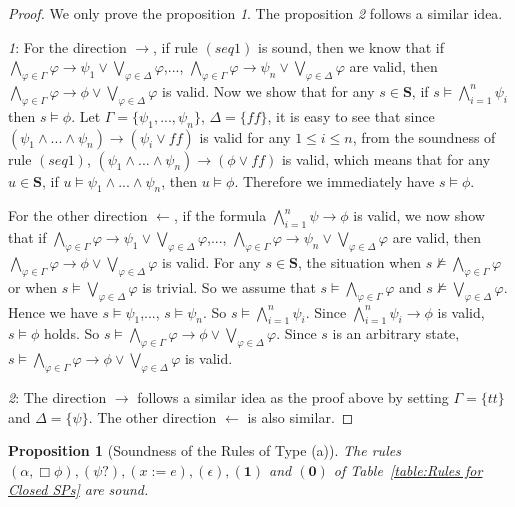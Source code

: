 \documentclass{fcs}
\newtheorem{prop}{Proposition}[section]
\newcommand{\bff}[1]{\mathbf{#1}}
\newcommand{\noth}[0]{\mathbf{1}}
\newcommand{\halt}[0]{\mathbf{0}}
\newcommand{\true}[0]{\mathit{tt}}
\newcommand{\false}[0]{\mathit{ff}}
\begin{document}
\begin{proof}
We only prove the proposition \textit{1}.
The proposition \textit{2} follows a similar idea.

\textit{1}:
For the direction $\rightarrow$, if rule $(\mathit{seq1})$ is sound, then we know that if
$\bigwedge_{\varphi\in \Gamma}\varphi \to \psi_1\vee \bigvee_{\varphi\in \Delta}\varphi$,...,
$\bigwedge_{\varphi\in \Gamma}\varphi \to \psi_n\vee \bigvee_{\varphi\in \Delta}\varphi$ are valid, then
$\bigwedge_{\varphi\in \Gamma}\varphi \to \phi\vee \bigvee_{\varphi\in \Delta}\varphi$ is valid.
Now we show that for any $s\in \bff{S}$, if $s\models \bigwedge^n_{i=1} \psi_i$ then $s\models \phi$.
Let $\Gamma = \{\psi_1,...,\psi_n\}$, $\Delta = \{\false\}$, it is easy to see that
since $(\psi_1\wedge...\wedge\psi_n) \to (\psi_i\vee \false)$ is valid for any $1\le i\le n$, from the soundness of rule $(\mathit{seq1})$,
$(\psi_1\wedge...\wedge\psi_n)\to (\phi \vee \false)$ is valid, which means that for any $u\in \bff{S}$, if $u\models \psi_1\wedge...\wedge\psi_n$, then $u\models \phi$.
Therefore we immediately have $s\models \phi$.

For the other direction $\leftarrow$, if the formula $\bigwedge^n_{i=1} \psi \to \phi$ is valid, we now show that if
$\bigwedge_{\varphi\in \Gamma}\varphi \to \psi_1\vee \bigvee_{\varphi\in \Delta}\varphi$,...,
$\bigwedge_{\varphi\in \Gamma}\varphi \to \psi_n\vee \bigvee_{\varphi\in \Delta}\varphi$ are valid, then
$\bigwedge_{\varphi\in \Gamma}\varphi \to \phi\vee \bigvee_{\varphi\in \Delta}\varphi$ is valid.
For any $s\in \bff{S}$,
the situation when $s\not \models \bigwedge_{\varphi\in \Gamma}\varphi$ or when $s\models \bigvee_{\varphi\in \Delta}\varphi$ is trivial.
So we assume that $s\models \bigwedge_{\varphi\in \Gamma}\varphi$ and $s\not\models \bigvee_{\varphi\in \Delta}\varphi$.
Hence we have $s\models \psi_1$,..., $s\models \psi_n$. So $s\models \bigwedge^n_{i=1}\psi_i$.
Since $\bigwedge^n_{i=1} \psi_i \to \phi$ is valid, $s\models \phi$ holds.
So $s\models \bigwedge_{\varphi\in \Gamma}\varphi \to \phi\vee \bigvee_{\varphi\in \Delta}\varphi$.
Since $s$ is an arbitrary state, $s\models \bigwedge_{\varphi\in \Gamma}\varphi \to \phi\vee \bigvee_{\varphi\in \Delta}\varphi$ is valid.

\textit{2}: The direction $\rightarrow$ follows a similar idea as the proof above by setting $\Gamma = \{\true\}$ and $\Delta = \{\psi\}$.
The other direction $\leftarrow$ is also similar.
\end{proof}

\begin{prop}[Soundness of the Rules of Type (a)]
    The rules $(\alpha, \Box\phi), (\psi?), (x:=e), (\epsilon), (\noth)$ and $(\halt)$ of Table~\ref{table:Rules for Closed SPs} are sound.
\end{prop}
\end{document}
